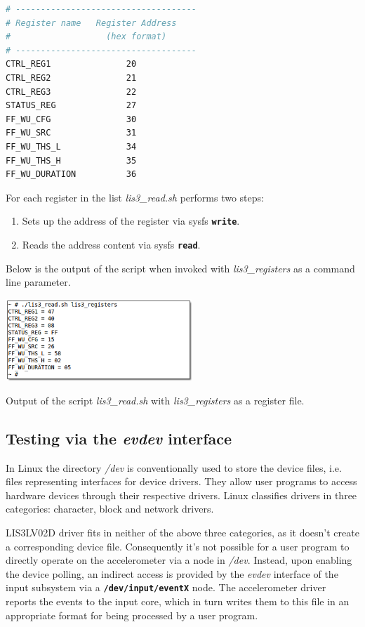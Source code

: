 \documentclass[a4paper,10pt]{article}
\makeatletter
\newenvironment{figurehere}{\def\@captype{figure}\vspace{2ex}}{\vspace{2ex}}
\newenvironment{packedenum}{
\begin{enumerate}
  \setlength{\itemsep}{3pt}
  \setlength{\parskip}{0pt}
  \setlength{\parsep}{0pt}
}{\end{enumerate}}
\newcommand{\keyword}[1]{\texttt{\textbf{#1}}}
\makeatother
\begin{document}
\begin{multicols}{2}
\begin{lstlisting}[language=bash]
# ------------------------------------
# Register name   Register Address
#                   (hex format)
# ------------------------------------
CTRL_REG1               20
CTRL_REG2               21
CTRL_REG3               22
STATUS_REG              27
FF_WU_CFG               30
FF_WU_SRC               31
FF_WU_THS_L             34
FF_WU_THS_H             35
FF_WU_DURATION          36
\end{lstlisting}

For each register in the list \emph{lis3\_read.sh} performs two steps:

\begin{packedenum}
	\item Sets up the address of the register via sysfs \keyword{write}.
	\item Reads the address content via sysfs \keyword{read}.
\end{packedenum}

Below is the output of the script when invoked with \emph{lis3\_registers}
as a command line parameter.

\begin{figurehere}
 \centering
 \includegraphics[width=7cm]{./figures/dump-lis3-read.png}
 \caption{Output of the script \emph{lis3\_read.sh} with \emph{lis3\_registers}
 	as a register file.}
 \label{fig:lis3-read}
\end{figurehere}


\subsection{Testing via the \emph{evdev} interface}
\label{sec:evdev-testing}

In Linux the directory \emph{/dev} is conventionally used to store the
device files, i.e. files representing interfaces for device drivers. They
allow user programs to access hardware devices through their respective
drivers. Linux classifies drivers in three categories: character, block and
network drivers.

LIS3LV02D driver fits in neither of the above three categories, as it doesn't
create a corresponding device file.
Consequently it's not possible for a user program to directly operate on the
accelerometer via a node in \emph{/dev}.
Instead, upon enabling the device polling, an indirect access is provided by
the \emph{evdev} interface of the input subsystem via a
\keyword{/dev/input/eventX} node.
The accelerometer driver reports the events to the input core, which in turn
writes them to this file in an appropriate format for being processed by a user
program.


\end{multicols}
\end{document}
